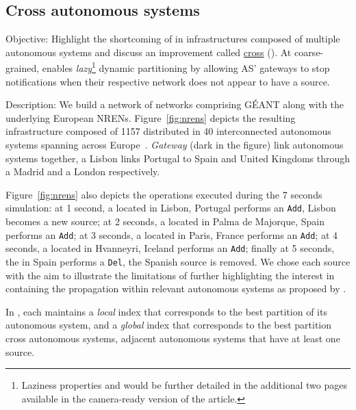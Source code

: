 \subsection{Cross autonomous systems}
\begin{asparadesc}
\item[Objective:] Highlight the shortcoming of \NAME in
  infrastructures composed of multiple autonomous systems and
    discuss an improvement called \underline{cross} \underline{\NAME}
    (\NAMEC). At coarse-grained, \NAMEC enables
    \emph{lazy}\footnote{Laziness properties and \NAMEC would be
    further detailed in the  additional two pages available in the
    camera-ready version of the article.} dynamic partitioning by
    allowing AS' gateways to stop notifications when their respective
    network does not appear to have a source.
    
  \item[Description:] We build a network of networks comprising
    G{\'E}ANT along with the underlying European NRENs.
    Figure~\ref{fig:nrens} depicts the resulting infrastructure
    composed of 1157 \processes distributed in 40 interconnected
    autonomous systems spanning across
    Europe~\cite{knight2011internet}. \emph{Gateway} \processes (dark
    in the figure) link autonomous systems together, \eg a Lisbon
    \node links Portugal to Spain and United Kingdoms through a Madrid
    \node and a London \node respectively.

    \noindent Figure~\ref{fig:nrens} also depicts the
    operations executed during the 7 seconds simulation: at 1 second,
    a \node located in Lisbon, Portugal performs an \texttt{Add}, \ie
    Lisbon becomes a new source; at 2 seconds, a \node located in
    Palma de Majorque, Spain performs an \texttt{Add}; at 3 seconds, a
    \node located in Paris, France performs an \texttt{Add}; at 4
    seconds, a \node located in Hvanneyri, Iceland performs an
    \texttt{Add}; finally at 5 seconds, the \node in Spain performs a
    \texttt{Del}, \ie the Spanish source is removed. We chose each source
    with the aim to illustrate the limitations of \NAME further highlighting
    the interest in containing the propagation within relevant autonomous systems
    as proposed by \NAMEC.
    
    \noindent In \NAMEC, each
    \process maintains a \emph{local} index that corresponds to the
    best partition of its autonomous system, and a \emph{global}
    index that corresponds to the best partition cross autonomous
    systems, \ie adjacent autonomous systems that have at least one
    source.
    

\end{asparadesc}

